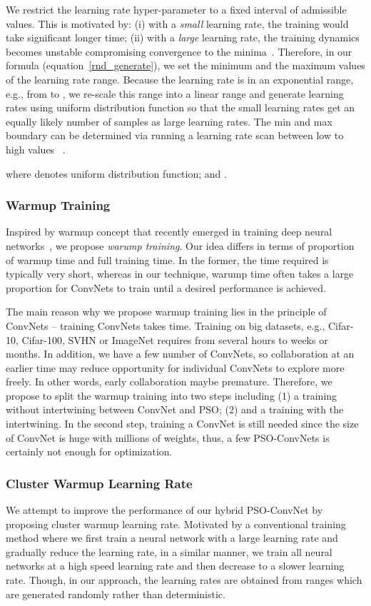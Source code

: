 \documentclass{ieeeaccess}
\begin{document}
We restrict the learning rate hyper-parameter to a fixed interval of admissible values. This is motivated by: (i) with a \textit{small} learning rate, the training would take significant longer time; (ii) with a \textit{large} learning rate, the training dynamics becomes unstable compromising convergence to the minima~\cite{hanin2018neural,hochreiter1991untersuchungen}. Therefore, in our formula (equation~\eqref{rnd_generate}), we set the minimum and the maximum values of the learning rate range. Because the learning rate is in an exponential range, e.g., from  to , we re-scale this range into a linear range and generate learning rates using uniform distribution function so that the small learning rates get an equally likely number of samples as large learning rates. The min and max boundary can be determined via running a learning rate scan between low to high values ~\cite{smith2017cyclical}.

where  denotes uniform distribution function;  and .
\subsubsection{Warmup Training}
\label{sec:warmuptraining}
Inspired by warmup concept that recently emerged in training deep neural networks~\cite{vaswani2017attention,goyal2017accurate,gotmare2018closer,liu2019variance}, we propose \emph{warump training}. Our idea differs in terms of proportion of warmup time and full training time. In the former, the time required is typically very short, whereas in our technique, warump time often takes a large proportion for ConvNets to train until a desired performance is achieved.

The main reason why we propose warmup training lies in the principle of ConvNets -- training ConvNets takes time. Training on big datasets, e.g., Cifar-10, Cifar-100, SVHN or ImageNet requires from several hours to weeks or months. In addition, we have a few number of ConvNets, so collaboration at an earlier time may reduce opportunity for individual ConvNets to explore more freely. In other words, early collaboration maybe premature. Therefore, we propose to split the warmup training into two steps including (1) a training without intertwining between ConvNet and PSO; (2) and a training with the intertwining. In the second step, training a ConvNet is still needed since the size of ConvNet is huge with millions of weights, thus, a few PSO-ConvNets is certainly not enough for optimization.
\subsubsection{Cluster Warmup Learning Rate}
We attempt to improve the performance of our hybrid PSO-ConvNet by proposing cluster warmup learning rate. Motivated by a conventional training method where we first train a neural network with a large learning rate and gradually reduce the learning rate, in a similar manner, we train all neural networks at a high speed learning rate and then decrease to a slower learning rate. Though, in our approach, the learning rates are obtained from ranges which are generated randomly rather than deterministic.
\end{document}
